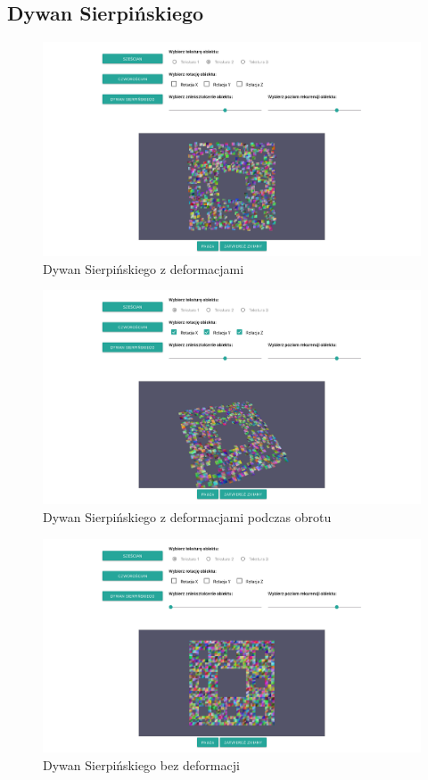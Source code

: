 \documentclass[12pt,a4paper,titlepage]{article}
\begin{document}
\subsection{Dywan Sierpińskiego}
\begin{figure}[H]
\centering
\includegraphics[width=14cm]{images/carpet_still.png}
\caption{Dywan Sierpińskiego z deformacjami}
\label{fig:eggWithLight}
\end{figure}

\begin{figure}[H]
\centering
\includegraphics[width=14cm]{images/carpet_rotating.png}
\caption{Dywan Sierpińskiego z deformacjami podczas obrotu}
\label{fig:eggWithLight}
\end{figure}

\begin{figure}[H]
\centering
\includegraphics[width=14cm]{images/carpet_still_no_disruption.png}
\caption{Dywan Sierpińskiego bez deformacji}
\label{fig:eggWithLight}
\end{figure}
\end{document}
